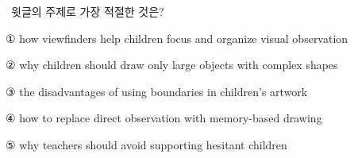 \documentclass[11pt,a4paper]{article}
\newcommand{\qno}[1]{\par\vspace{8pt}\noindent{\sffamily\bfseries #1.}\ }
\newcommand{\instr}[1]{{\sffamily #1}\par\vspace{3pt}}
\begin{document}
\qno{4}\instr{윗글의 주제로 가장 적절한 것은?}
\begin{choices}
\item ① how viewfinders help children focus and organize visual observation
\item ② why children should draw only large objects with complex shapes
\item ③ the disadvantages of using boundaries in children's artwork
\item ④ how to replace direct observation with memory-based drawing
\item ⑤ why teachers should avoid supporting hesitant children
\end{choices}
\end{document}
